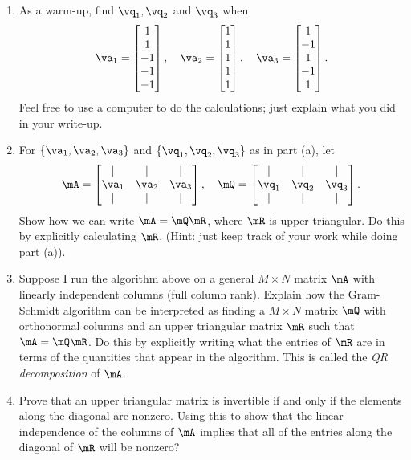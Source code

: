 \documentclass[11pt]{article}
\begin{document}
\begin{enumerate}
\begin{enumerate}
	\item As a warm-up, find $\vq_1,\vq_2$ and $\vq_3$ when
	\[
		\va_1 = \begin{bmatrix} 1 \\ 1 \\ -1 \\ -1 \\ -1\end{bmatrix},
		\quad
		\va_2 = \begin{bmatrix} 1 \\ 1 \\ 1 \\ 1 \\ 1\end{bmatrix},
		\quad
		\va_3 = \begin{bmatrix} 1 \\ -1 \\ 1 \\ -1 \\ 1 \end{bmatrix}.
	\]
	Feel free to use a computer to do the calculations; just explain what you did in your write-up.
	
	\item For $\{\va_1,\va_2,\va_3\}$ and $\{\vq_1,\vq_2,\vq_3\}$ as in part (a), let
	\[
		\mA = \begin{bmatrix} | & | & | \\ \va_1 & \va_2 & \va_3 \\ | & | & | \end{bmatrix},
		\quad
		\mQ = \begin{bmatrix} | & | & | \\ \vq_1 & \vq_2 & \vq_3 \\ | & | & | \end{bmatrix}.
	\]
	Show how we can write $\mA = \mQ\mR$, where $\mR$ is upper triangular.  Do this by explicitly calculating $\mR$.  (Hint: just keep track of your work while doing part (a)).
	
	\item Suppose I run the algorithm above on a general $M\times N$ matrix $\mA$ with linearly independent columns (full column rank).  Explain how the Gram-Schmidt algorithm can be interpreted as finding a $M\times N$ matrix $\mQ$ with orthonormal columns and an upper triangular matrix $\mR$ such that $\mA=\mQ\mR$.  Do this by explicitly writing what the entries of $\mR$ are in terms of the quantities that appear in the algorithm.  This is called the {\em QR decomposition} of $\mA$.
	
	\item Prove that an upper triangular matrix is invertible if and only if the elements along the diagonal are nonzero.  Using this to show that the linear independence of the columns of $\mA$ implies that all of the entries along the diagonal of $\mR$ will be nonzero?
	

\end{enumerate}
\end{enumerate}
\end{document}
